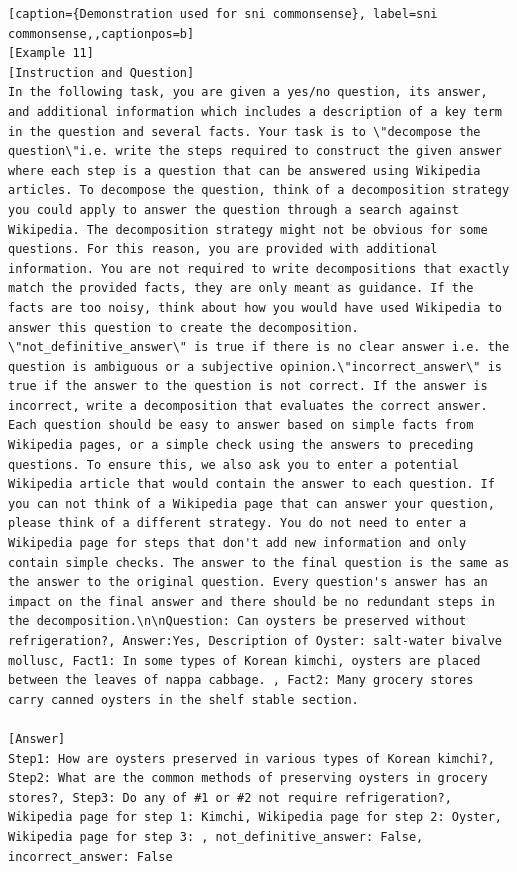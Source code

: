 \begin{lstlisting}[caption={Demonstration used for sni commonsense}, label=sni commonsense,,captionpos=b]
[Example 11]
[Instruction and Question]
In the following task, you are given a yes/no question, its answer, and additional information which includes a description of a key term in the question and several facts. Your task is to \"decompose the question\"i.e. write the steps required to construct the given answer where each step is a question that can be answered using Wikipedia articles. To decompose the question, think of a decomposition strategy you could apply to answer the question through a search against Wikipedia. The decomposition strategy might not be obvious for some questions. For this reason, you are provided with additional information. You are not required to write decompositions that exactly match the provided facts, they are only meant as guidance. If the facts are too noisy, think about how you would have used Wikipedia to answer this question to create the decomposition. \"not_definitive_answer\" is true if there is no clear answer i.e. the question is ambiguous or a subjective opinion.\"incorrect_answer\" is true if the answer to the question is not correct. If the answer is incorrect, write a decomposition that evaluates the correct answer. Each question should be easy to answer based on simple facts from Wikipedia pages, or a simple check using the answers to preceding questions. To ensure this, we also ask you to enter a potential Wikipedia article that would contain the answer to each question. If you can not think of a Wikipedia page that can answer your question, please think of a different strategy. You do not need to enter a Wikipedia page for steps that don't add new information and only contain simple checks. The answer to the final question is the same as the answer to the original question. Every question's answer has an impact on the final answer and there should be no redundant steps in the decomposition.\n\nQuestion: Can oysters be preserved without refrigeration?, Answer:Yes, Description of Oyster: salt-water bivalve mollusc, Fact1: In some types of Korean kimchi, oysters are placed between the leaves of nappa cabbage. , Fact2: Many grocery stores carry canned oysters in the shelf stable section. 

[Answer]
Step1: How are oysters preserved in various types of Korean kimchi?, Step2: What are the common methods of preserving oysters in grocery stores?, Step3: Do any of #1 or #2 not require refrigeration?, Wikipedia page for step 1: Kimchi, Wikipedia page for step 2: Oyster, Wikipedia page for step 3: , not_definitive_answer: False, incorrect_answer: False


\end{lstlisting}
